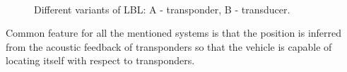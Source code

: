 \begin{figure}%
  \begin{center}
       \\
  \end{center}
  \caption{Different variants of LBL: A - transponder, B - transducer.}
  \vspace{-10pt}
  \label{fig:lbl}
\end{figure}
Common feature for all the mentioned systems is that the position is inferred from the acoustic feedback of transponders so that the vehicle is capable of locating itself with respect to transponders.  

